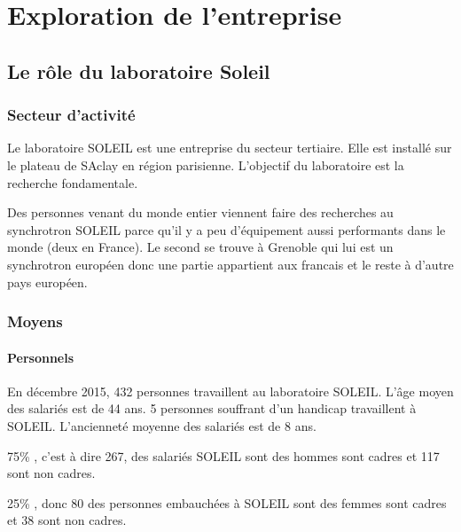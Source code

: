 \chapter{Exploration de l'entreprise}
	\minitoc






\section{Le rôle du laboratoire Soleil}

	\subsection{Secteur d'activité}
				Le laboratoire SOLEIL est une entreprise du secteur tertiaire. Elle est installé sur le plateau de SAclay en région parisienne. L'objectif du laboratoire est la recherche fondamentale.
				
				Des personnes venant du monde entier viennent faire des recherches au synchrotron SOLEIL parce qu'il y a peu d'équipement aussi performants dans le monde (deux en France). Le second se trouve à Grenoble qui lui est un synchrotron européen donc une partie appartient aux francais et le reste à d'autre pays européen.
	\subsection{Moyens}
		
		\subsubsection{Personnels}
				En décembre 2015, 432 personnes travaillent au laboratoire SOLEIL. L'âge moyen des salariés est de 44 ans. 5 personnes souffrant d'un handicap travaillent à SOLEIL. L'ancienneté moyenne des salariés est de 8 ans.
				
				75\% , c'est à dire 267, des salariés SOLEIL sont des hommes sont cadres et 117 sont non cadres.
				
				25\% , donc 80 des personnes embauchées à SOLEIL sont des femmes sont cadres et 38 sont non cadres.


